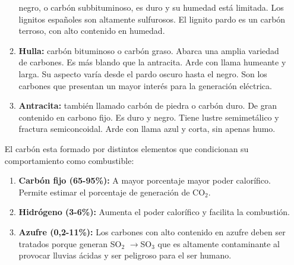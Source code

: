 \begin{enumerate}
\begin{enumerate}
			negro, o carbón subbituminoso, es duro y su humedad está limitada.
			Los lignitos españoles son altamente sulfurosos. El lignito
			pardo es un carbón terroso, con alto contenido en humedad.
			\item \textbf{Hulla:}
			carbón bituminoso o carbón graso. Abarca una amplia variedad de carbones.
			Es más blando que la antracita. Arde con llama humeante y larga. Su aspecto varía desde el pardo oscuro hasta
			el negro. Son los carbones que presentan un mayor interés para la generación eléctrica.
			\item \textbf{Antracita:}
			también llamado carbón de piedra o carbón duro. De gran contenido en carbono fijo. Es duro y negro. Tiene lustre semimetálico y fractura semiconcoidal. Arde con llama azul y
			corta, sin apenas humo.
		\end{enumerate}
		El carbón esta formado por distintos elementos que condicionan su comportamiento como combustible:
		\begin{enumerate}
			\item \textbf{Carbón fijo (65-95\%):}
				A mayor porcentaje mayor poder calorífico. Permite estimar el porcentaje de generación de CO$_2$.
			\item \textbf{Hidrógeno (3-6\%):}
				Aumenta el poder calorífico y facilita la combustión.
			\item \textbf{Azufre (0,2-11\%):}
				Los carbones con alto contenido en azufre deben ser tratados porque generan SO$_2$ $\rightarrow$SO$_3$ que es altamente contaminante al provocar lluvias ácidas y ser peligroso para el ser humano.
				

\end{enumerate}
\end{enumerate}
